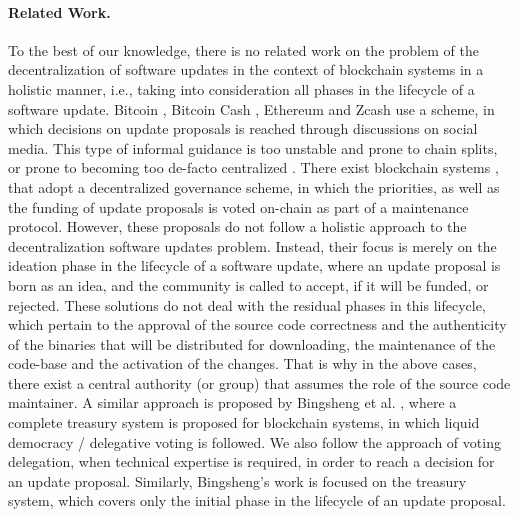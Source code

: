 \paragraph{Related Work.}
To the best of our knowledge, there is no related work on the problem of the decentralization of software updates in the context of blockchain systems in a holistic manner, i.e., taking into consideration all phases in the lifecycle of a software update. 
Bitcoin \cite{bitcoin}, Bitcoin Cash , Ethereum \cite{ethereum} and Zcash  use a  scheme, in which decisions on update proposals is reached through discussions on social media. This type of informal guidance is  too unstable and prone to chain splits, or prone to becoming too de-facto centralized \cite{buterin_on_gov}. There exist blockchain systems \cite{dash}, \cite{decred} that adopt a decentralized governance scheme, in which the priorities, as well as the funding of update proposals is voted on-chain as part of a maintenance protocol. However, these proposals do not follow a holistic approach to the decentralization software updates problem. Instead, their focus is merely on the ideation phase in the lifecycle of a software update, where an update proposal is born as an idea, and the community is called to accept, if it will be funded, or rejected. These solutions do not deal with the residual phases in this lifecycle, which pertain to the approval of the source code correctness and the authenticity of the binaries that will be distributed for downloading, the maintenance of the code-base and the activation of the changes. That is why in the above cases, there exist a central authority (or group) that assumes the role of the source code maintainer. A similar approach is proposed by Bingsheng et al. \cite{cryptoeprint:2018:435}, where a complete treasury system is proposed for blockchain systems, in which liquid democracy / delegative voting is followed. We also follow the approach of voting delegation, when technical expertise is required, in order to reach a decision for an update proposal. Similarly, Bingsheng's work is focused on the treasury system, which covers only the initial phase in the lifecycle of an update proposal.


%
